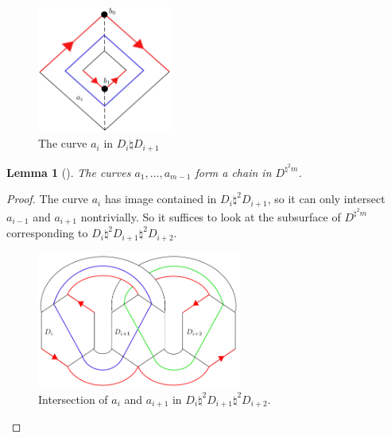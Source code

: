 \documentclass[reqno]{amsart}
\newtheorem{lemma}[theorem]{Lemma}
\theoremstyle{definition}
\theoremstyle{remark}
\begin{document}
\begin{figure}[H]
    \centering
    \includegraphics[width=0.4\textwidth]{curvem2.png}
    \caption{The curve $a_i$ in $D_i \natural D_{i+1}$}
    \label{fig:curve-m-2-png}
\end{figure}

\begin{lemma}[]
    The curves $a_1, \ldots, a_{m-1}$ form a chain in
    $D^{\natural^2 m}$.
\end{lemma}

\begin{proof}
    The curve $a_i$ has image contained in $D_i \natural^2 D_{i+1}$,
    so it can only intersect $a_{i-1}$ and $a_{i+1}$ nontrivially.
    So it suffices to look at the subsurface of
    $D^{\natural^2 m}$ corresponding to
    $D_i \natural^2 D_{i+1} \natural^2 D_{i+2}$.

    \begin{figure}[H]
        \centering
        \includegraphics[width=0.6\textwidth]{intersection-a_is.png}
        \caption{Intersection of
        $a_i$ and $a_{i+1}$ in
    $D_i \natural^2 D_{i+1} \natural^2 D_{i+2}$.}
        \label{fig:intersection-a_is-png}
    \end{figure}
\end{proof}
\end{document}
